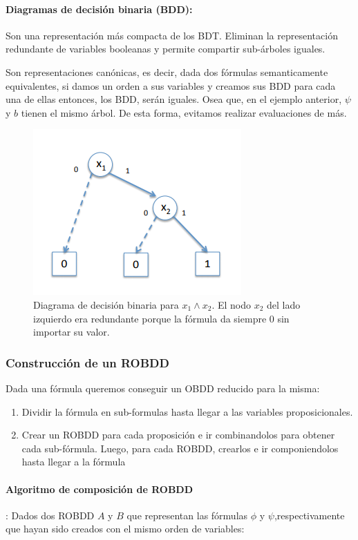 \paragraph{Diagramas de decisión binaria (BDD):} Son una representación más compacta de los BDT. Eliminan la representación redundante de variables booleanas y permite compartir sub-árboles iguales.

Son representaciones canónicas, es decir, dada dos fórmulas semanticamente equivalentes, si damos un orden a sus variables y creamos sus BDD para cada una de ellas entonces, los BDD, serán iguales. Osea que, en el ejemplo anterior, $\psi$ y $b$ tienen el mismo árbol. De esta forma, evitamos  realizar evaluaciones de más.
\begin{figure}[h]
\centering
	\includegraphics[scale=0.5]{imagenes/bdd}
	\caption{Diagrama de decisión binaria para $x_1 \land x_2$. El nodo $x_2$ del lado izquierdo era redundante porque la fórmula da siempre $0$ sin importar su valor.}
\end{figure}

\subsubsection{Construcción de un ROBDD}
Dada una fórmula queremos conseguir un OBDD reducido para la misma:
\begin{enumerate}
\item Dividir la fórmula en sub-formulas hasta llegar a las variables proposicionales.
\item Crear un ROBDD para cada proposición e ir combinandolos para obtener cada sub-fórmula. Luego, para cada ROBDD, crearlos e ir componiendolos hasta llegar a la fórmula
\end{enumerate}

\paragraph{Algoritmo de composición de ROBDD}:
Dados dos ROBDD $A$ y $B$ que representan las fórmulas $\phi$ y $\psi$,respectivamente que hayan sido creados con el mismo orden de variables:

